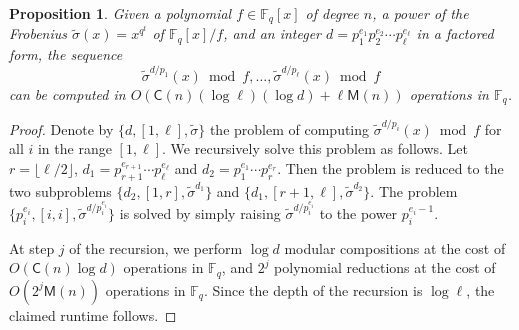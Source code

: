 \documentclass[12pt]{article}
\theoremstyle{plain}
\newtheorem{proposition}[theorem]{Proposition}
\theoremstyle{definition}
\def\F{\ensuremath{\mathbb{F}}}
\def\MM{\ensuremath{\mathsf{M}}}
\def\CC{\ensuremath{\mathsf{C}}}
\begin{document}
\begin{proposition}
	\label{prop:frobs}
	Given a polynomial $f \in \F_q[x]$ of degree $n$, a power of the Frobenius $\tilde{\sigma}(x) = 
	x^{q^t}$ of $\F_q[x] / f$, and an integer $d = p_1^{e_1} p_2^{e_2} \cdots p_\ell^{e_\ell}$ in a 
	factored form, the sequence
	\begin{equation}
	\label{equ:frobs}
		\tilde{\sigma}^{d / p_1}(x) \bmod f, \dots, \tilde{\sigma}^{d / p_\ell}(x) \bmod f
	\end{equation}
	can be computed in $O(\CC(n)(\log \ell)(\log d) + \ell\MM(n))$ operations in $\F_q$.
\end{proposition}
\begin{proof}
	Denote by $\{ d, [1, \ell], \tilde{\sigma} \}$ the problem of computing $\tilde{\sigma}^{d / 
	p_i}(x) \bmod f$ for all $i$ in the range $[1, \ell]$. We recursively solve this problem as 
	follows. Let $r = \lfloor \ell / 2 \rfloor$, $d_1 = p_{r + 1}^{e_{r + 1}} \cdots 
	p_\ell^{e_\ell}$ and $d_2 = p_1^{e_1} \cdots p_r^{e_r}$. Then the problem is reduced to the 
	two subproblems $\{ d_2, [1, r], \tilde{\sigma}^{d_1} \}$ and $\{ d_1, [r + 1, \ell], 
	\tilde{\sigma}^{d_2} \}$. The problem $\{ p_i^{e_i}, [i, i], \tilde{\sigma}^{d / p_i^{e_i}} \}$ 
	is solved by simply raising $\tilde{\sigma}^{d / p_i^{e_i}}$ to the power $p_i^{e_i - 1}$.
	
	At step $j$ of the recursion, we perform $\log d$ modular compositions at the cost of $O(\CC(n) 
	\log d)$ operations in $\F_q$, and $2^j$ polynomial reductions at the cost of $O(2^j\MM(n))$ 
	operations in $\F_q$. Since the depth of the recursion is $\log \ell$, the claimed runtime 
	follows.
\end{proof}







\end{document}
